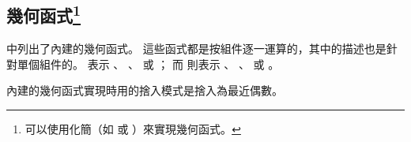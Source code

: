 \subsection[sec:geomtricFunc]{幾何函式\footnote{
可以使用化簡（如  或 ）來實現幾何函式。}}

中列出了內建的幾何函式。
這些函式都是按組件逐一運算的，其中的描述也是針對單個組件的。
 表示
 、 、  或 ；
而  則表示
 、 、  或 。

內建的幾何函式實現時用的捨入模式是捨入為最近偶數。

{}
